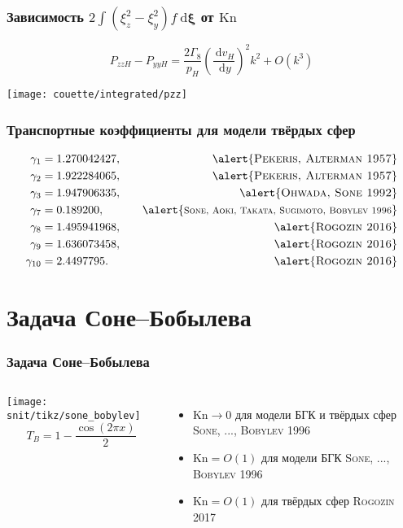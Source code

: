 \documentclass[mathserif]{beamer} %
\newcommand{\Kn}{\mathrm{Kn}}
\newcommand{\dd}{\:\mathrm{d}}
\newcommand{\der}[2][]{\frac{\dd#1}{\dd#2}}
\newcommand{\dxi}{\boldsymbol{\dd\xi}}
\newcommand{\OO}[1]{O(#1)}
\newcommand{\Cite}[2][]{\alert{\textsc{#2 #1}}}
\begin{document}
\begin{frame}
    \frametitle{Зависимость \(2\int(\xi_z^2-\xi_y^2)f\dxi\) от \(\Kn\)}
    \vspace{-15pt}
    \[ P_{zzH} - P_{yyH} = \frac{2\Gamma_8}{p_H}\left(\der[v_H]{y}\right)^2 k^2 + \OO{k^3} \]
    \vspace{-15pt}

    \centering\hspace{-1.5cm}
    \texttt{[image: couette/integrated/pzz]}
    \hspace{-1.5cm}
\end{frame}

\begin{frame}
    \frametitle{Транспортные коэффициенты для модели твёрдых сфер}
    \begin{alignat*}{2}
        \gamma_1 &= 1.270042427, \quad &\text{\Cite[1957]{Pekeris, Alterman}} \\
        \gamma_2 &= 1.922284065, \quad &\text{\Cite[1957]{Pekeris, Alterman}} \\
        \gamma_3 &= 1.947906335, \quad &\text{\Cite[1992]{Ohwada, Sone}} \\
        \gamma_7 &= 0.189200,    \quad &\text{\Cite[1996]{\footnotesize Sone, Aoki, Takata, Sugimoto, Bobylev}} \\
        \gamma_8 &= 1.495941968, \quad &\text{\Cite[2016]{Rogozin}} \\
        \gamma_9 &= 1.636073458, \quad &\text{\Cite[2016]{Rogozin}} \\
        \gamma_{10} &= 2.4497795.\quad &\text{\Cite[2016]{Rogozin}}
    \end{alignat*}
\end{frame}

\section{Задача Соне--Бобылева}

\begin{frame}
    \frametitle{Задача Соне--Бобылева}
    \begin{columns}
        \hspace{-10pt}\texttt{[image: snit/tikz/sone\_bobylev]}
        \[ T_B = 1 - \frac{\cos(2\pi x)}{2} \]
        \begin{itemize}
            \item \(\Kn\to0\) для модели БГК и твёрдых сфер \\ \Cite[1996]{Sone, ..., Bobylev}
            \smallskip
            \item \(\Kn=\OO{1}\) для модели БГК \Cite[1996]{Sone, ..., Bobylev}
            \smallskip
            \item \(\Kn=\OO{1}\) для твёрдых сфер \Cite[2017]{Rogozin}
        \end{itemize}
    \end{columns}
\end{frame}
\end{document}
